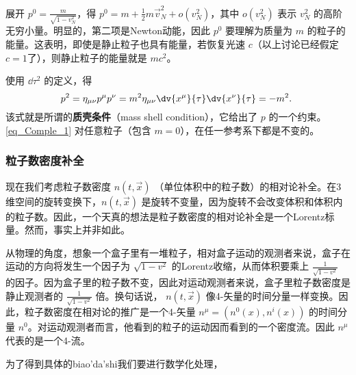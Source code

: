 展开 $p^0=\frac{m}{\sqrt{1-v_N^2}}$，得 $p^0=m+\frac{1}{2}m\vec v_N^2+o(v_N^2)$，其中 $o(v_N^2)$ 表示 $v_N^2$ 的高阶无穷小量。明显的，第二项是Newton动能，因此 $p^0$ 要理解为质量为 $m$ 的粒子的能量。这表明，即使是静止粒子也具有能量，若恢复光速 $c$（以上讨论已经假定 $c=1$了），则静止粒子的能量就是 $mc^2$。

使用 $\dd\tau^2$ 的定义，得
\begin{equation}\label{eq_Comple_1}
p^2=\eta_{\mu\nu}p^\mu p^\nu=m^2\eta_{\mu\nu}\dv{x^\mu}{\tau}\dv{x^\nu}{\tau}=-m^2.~
\end{equation}
该式就是所谓的\textbf{质壳条件}（mass shell condition），它给出了 $p$ 的一个约束。\autoref{eq_Comple_1} 对任意粒子（包含 $m=0$），在任一参考系下都是不变的。


\subsubsection{粒子数密度补全}

现在我们考虑粒子数密度 $n(t,\vec x)$ （单位体积中的粒子数）的相对论补全。在3维空间的旋转变换下，$n(t,\vec x)$ 是旋转不变量，因为旋转不会改变体积和体积内的粒子数。因此，一个天真的想法是粒子数密度的相对论补全是一个Lorentz标量。然而，事实上并非如此。

从物理的角度，想象一个盒子里有一堆粒子，相对盒子运动的观测者来说，盒子在运动的方向将发生一个因子为 $\sqrt{1-v^2}$ 的Lorentz收缩，从而体积要乘上 $\frac{1}{\sqrt{1-v^2}}$ 的因子。因为盒子里的粒子数不变，因此对运动观测者来说，盒子里粒子数密度是静止观测者的 $\frac{1}{\sqrt{1-v^2}}$ 倍。换句话说， $n(t,\vec x)$ 像4-矢量的时间分量一样变换。因此，粒子数密度在相对论的推广是一个4-矢量 $n^\mu=(n^0(x),n^i(x))$ 的时间分量 $n^0$。对运动观测者而言，他看到的粒子的运动因而看到的一个密度流。因此 $n^\mu$ 代表的是一个4-流。

为了得到具体的biao'da'shi我们要进行数学化处理，




















